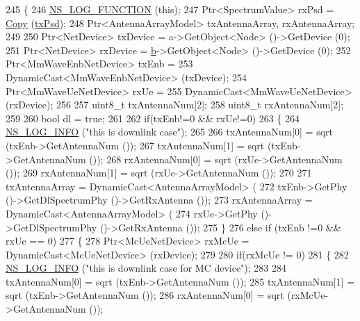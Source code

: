 \begin{DoxyCode}
245 \{
246         \hyperlink{log-macros-disabled_8h_a90b90d5bad1f39cb1b64923ea94c0761}{NS\_LOG\_FUNCTION} (\textcolor{keyword}{this});
247         Ptr<SpectrumValue> rxPsd = \hyperlink{namespacens3_a952d99f6d759fee74dda19f308451bc1}{Copy} (\hyperlink{lte__link__budget_8m_a684fe3101a5e48a5fcc57cab8dbcd1aa}{txPsd});
248         Ptr<AntennaArrayModel> txAntennaArray, rxAntennaArray;
249 
250         Ptr<NetDevice> txDevice = a->GetObject<Node> ()->GetDevice (0);
251         Ptr<NetDevice> rxDevice = \hyperlink{buildings__pathloss_8m_a21ad0bd836b90d08f4cf640b4c298e7c}{b}->GetObject<Node> ()->GetDevice (0);
252         Ptr<MmWaveEnbNetDevice> txEnb =
253                                         DynamicCast<MmWaveEnbNetDevice> (txDevice);
254         Ptr<MmWaveUeNetDevice> rxUe =
255                                         DynamicCast<MmWaveUeNetDevice> (rxDevice);
256 
257         uint8\_t txAntennaNum[2];
258         uint8\_t rxAntennaNum[2];
259 
260         \textcolor{keywordtype}{bool} dl = \textcolor{keyword}{true};
261 
262         \textcolor{keywordflow}{if}(txEnb!=0 && rxUe!=0)
263         \{
264                 \hyperlink{group__logging_gafbd73ee2cf9f26b319f49086d8e860fb}{NS\_LOG\_INFO} (\textcolor{stringliteral}{"this is downlink case"});
265 
266                 txAntennaNum[0] = sqrt (txEnb->GetAntennaNum ());
267                 txAntennaNum[1] = sqrt (txEnb->GetAntennaNum ());
268                 rxAntennaNum[0] = sqrt (rxUe->GetAntennaNum ());
269                 rxAntennaNum[1] = sqrt (rxUe->GetAntennaNum ());
270 
271                 txAntennaArray = DynamicCast<AntennaArrayModel> (
272                                         txEnb->GetPhy ()->GetDlSpectrumPhy ()->GetRxAntenna ());
273                 rxAntennaArray = DynamicCast<AntennaArrayModel> (
274                                         rxUe->GetPhy ()->GetDlSpectrumPhy ()->GetRxAntenna ());
275         \}
276         \textcolor{keywordflow}{else} \textcolor{keywordflow}{if} (txEnb !=0 && rxUe == 0)
277         \{
278                 Ptr<McUeNetDevice> rxMcUe = DynamicCast<McUeNetDevice> (rxDevice);
279 
280                 \textcolor{keywordflow}{if}(rxMcUe != 0)
281                 \{
282                         \hyperlink{group__logging_gafbd73ee2cf9f26b319f49086d8e860fb}{NS\_LOG\_INFO} (\textcolor{stringliteral}{"this is downlink case for MC device"});
283 
284                         txAntennaNum[0] = sqrt (txEnb->GetAntennaNum ());
285                         txAntennaNum[1] = sqrt (txEnb->GetAntennaNum ());
286                         rxAntennaNum[0] = sqrt (rxMcUe->GetAntennaNum ());

\end{DoxyCode}
